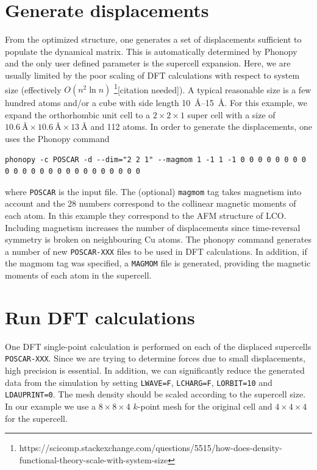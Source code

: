 \section{Generate displacements}
From the optimized structure, one generates a set of displacements sufficient to populate the dynamical matrix. This is automatically determined by Phonopy and the only user defined parameter is the supercell expansion. Here, we are usually limited by the poor scaling of DFT calculations with respect to system size (effectively $O(n^2 \ln n)$ \footnote{https://scicomp.stackexchange.com/questions/5515/how-does-density-functional-theory-scale-with-system-size}[citation needed]). A typical reasonable size is a few hundred atoms and/or a cube with side length \SIrange{10}{15}{\angstrom}. For this example, we expand the orthorhombic unit cell to a $2 \times 2 \times 1$ super cell with a size of $\SI{10.6}{\angstrom} \times \SI{10.6}{\angstrom} \times \SI{13}{\angstrom}$ and 112 atoms. In order to generate the displacements, one uses the Phonopy command
\begin{lstlisting}
phonopy -c POSCAR -d --dim="2 2 1" --magmom 1 -1 1 -1 0 0 0 0 0 0 0 0 0 0 0 0 0 0 0 0 0 0 0 0 0 0 0 0
\end{lstlisting}

\noindent where \texttt{POSCAR} is the input file. The (optional) \texttt{magmom} tag takes magnetism into account and the 28 numbers correspond to the collinear magnetic moments of each atom. In this example they correspond to the AFM structure of LCO. Including magnetism increases the number of displacements since time-reversal symmetry is broken on neighbouring Cu atoms. The phonopy command generates a number of new \texttt{POSCAR-XXX} files to be used in DFT calculations. In addition, if the magmom tag was specified, a \texttt{MAGMOM} file is generated, providing the magnetic moments of each atom in the supercell.

\section{Run DFT calculations}
One DFT single-point calculation is performed on each of the displaced supercells \texttt{POSCAR-XXX}. Since we are trying to determine forces due to small displacements, high precision is essential. In addition, we can significantly reduce the generated data from the simulation by setting \texttt{LWAVE=F}, \texttt{LCHARG=F}, \texttt{LORBIT=10} and \texttt{LDAUPRINT=0}. The mesh density should be scaled according to the supercell size. In our example we use a $8 \times 8 \times 4$ $k$-point mesh for the original cell and $4 \times 4 \times 4$ for the supercell.

